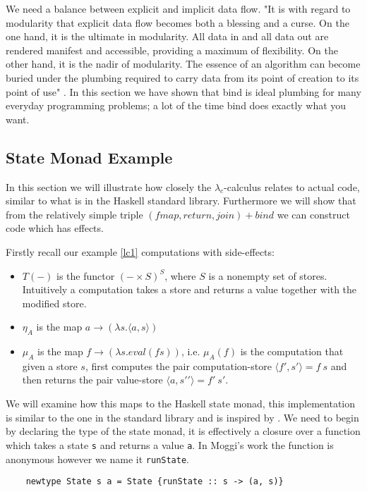 We need a balance between explicit and implicit data flow.
"It is with regard to modularity that explicit data flow becomes both a blessing and a curse.
On the one hand, it is the ultimate in modularity.
All data in and all data out are rendered manifest and accessible, providing a maximum of flexibility. On the other hand, it is the nadir of modularity. The essence of an algorithm can become buried under the plumbing required to carry data from its point of creation to its point of use"
\cite{wadler1995monads}.
In this section we have shown that bind is ideal plumbing
for many everyday programming problems;
a lot of the time bind does exactly what you want.

\subsection{State Monad Example}
In this section we will illustrate how closely
the $\lambda_c$-calculus relates to actual code,
similar to what is in the Haskell standard library.
Furthermore we will show that from the relatively
simple triple $(fmap,return,join) + bind$ we can
construct code which has effects.

Firstly recall our example \ref{lc1} computations with
side-effects\cite{moggi1989computational}:
\begin{itemize}
    \item $T(-)$ is the functor $(-\times S)^S$, where $S$ is a nonempty set of stores.
        Intuitively a computation takes a store and returns a value together with the modified store.
    \item $\eta_A$ is the map $a \rightarrow (\lambda s.\langle a,s \rangle)$
    \item $\mu_A$ is the map $f \rightarrow (\lambda s.eval(fs))$,
        i.e. $\mu_A(f)$ is the computation that given a store $s$,
        first computes the pair computation-store $\langle f\prime,s\prime\rangle = f\ s$
        and then returns the pair value-store $\langle a,s\prime\prime\rangle = f\prime\ s\prime$.
\end{itemize}

We will examine how this maps to the Haskell state monad,
this implementation is similar to the one in the standard library
and is inspired by \cite{jones1995functional}.
We need to begin by declaring the type of the state monad,
it is effectively a closure over a function
which takes a state \texttt{s} and returns a value \texttt{a}.
In Moggi's work the function is anonymous however we name it
\texttt{runState}.
\begin{verbatim}
    newtype State s a = State {runState :: s -> (a, s)}
\end{verbatim}

